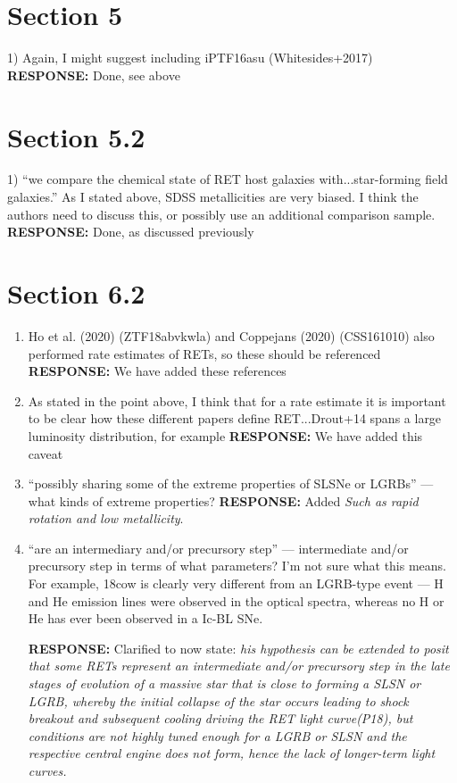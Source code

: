 \documentclass{article}
\begin{document}
\section*{Section 5}
1) Again, I might suggest including iPTF16asu (Whitesides+2017)
 \vskip0.1cm
 {\bf RESPONSE: } Done, see above
 
 \section*{Section 5.2}
 
 1)  “we compare the chemical state of RET host galaxies with...star-forming field galaxies.” As I stated
above, SDSS metallicities are very biased. I think the authors need to discuss this, or possibly use an additional comparison sample.
\vskip0.1cm
 {\bf RESPONSE: } Done, as discussed previously
 
 \section*{Section 6.2}
 \begin{enumerate}
     \item Ho et al. (2020) (ZTF18abvkwla) and Coppejans (2020) (CSS161010) also performed rate estimates of RETs, so these should be referenced
    \vskip0.1cm
 {\bf RESPONSE: }  We have added these references
 \item As stated in the point above, I think that for a rate estimate it is important to be clear how these different papers define RET...Drout+14 spans a large luminosity distribution, for example
\vskip0.1cm
 {\bf RESPONSE: } We have added this caveat
 
 \item “possibly sharing some of the extreme properties of SLSNe or LGRBs” — what kinds of extreme properties?
 \vskip0.1cm
 {\bf RESPONSE: } Added \textit{Such as rapid rotation and low metallicity}.
 
 \item “are an intermediary and/or precursory step” — intermediate and/or precursory step in terms of what parameters? I’m not sure what this means. For example, 18cow is clearly very different from an LGRB-type event — H and He emission lines were observed in the optical spectra, whereas no H or He has ever been observed in a Ic-BL SNe.
 
  \vskip0.1cm
 {\bf RESPONSE: } Clarified to now state: \textit{ his hypothesis can be extended to posit that some RETs represent an intermediate and/or precursory step in the late stages of evolution of a massive star that is close to forming a SLSN or LGRB, whereby the initial collapse of the star occurs leading to shock breakout and subsequent cooling driving the RET light curve(P18), but conditions are not highly tuned enough for a LGRB or SLSN and the respective central engine does not form, hence the lack of longer-term light curves.}
     
    
 \end{enumerate}
 
\end{document}
